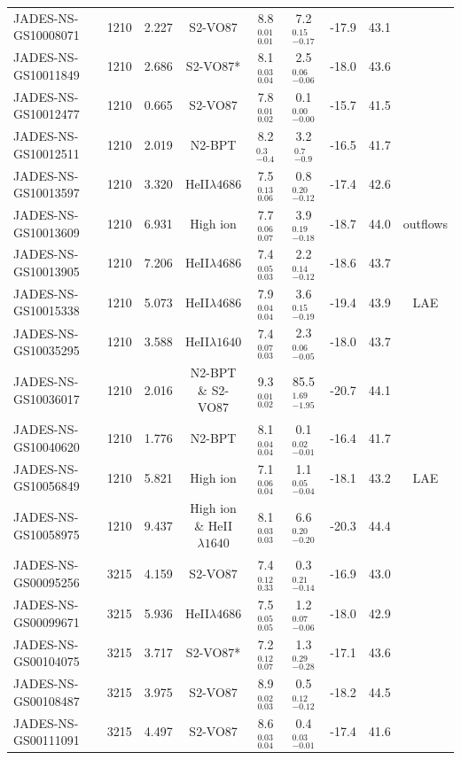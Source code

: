 \begin{tabular}{@{}lcccccccc@{}}
JADES-NS-GS10008071& 1210 &  2.227&S2-VO87&  8.8$^{0.01}_{0.01}$&  7.2$^{0.15}_{-0.17}$& -17.9&  43.1&\\
JADES-NS-GS10011849& 1210 &  2.686&S2-VO87*&  8.1$^{0.03}_{0.04}$&  2.5$^{0.06}_{-0.06}$& -18.0&  43.6&\\
JADES-NS-GS10012477& 1210 &  0.665&S2-VO87&  7.8$^{0.01}_{0.02}$&  0.1$^{0.00}_{-0.00}$& -15.7&  41.5&\\
JADES-NS-GS10012511& 1210 &  2.019&N2-BPT&  8.2 $^{0.3}_{-0.4}$&  3.2 $^{0.7}_{-0.9}$& -16.5&  41.7&\\
JADES-NS-GS10013597& 1210 &  3.320&HeII$\lambda4686$&  7.5$^{0.13}_{0.06}$&  0.8$^{0.20}_{-0.12}$& -17.4&  42.6&\\
JADES-NS-GS10013609& 1210 &  6.931&High ion&  7.7$^{0.06}_{0.07}$&  3.9$^{0.19}_{-0.18}$& -18.7&  44.0&outflows\\
JADES-NS-GS10013905& 1210 &  7.206&HeII$\lambda4686$&  7.4$^{0.05}_{0.03}$&  2.2$^{0.14}_{-0.12}$& -18.6&  43.7&\\
JADES-NS-GS10015338& 1210 &  5.073&HeII$\lambda4686$&  7.9$^{0.04}_{0.04}$&  3.6$^{0.15}_{-0.19}$& -19.4&  43.9&LAE\\
JADES-NS-GS10035295& 1210 &  3.588&HeII$\lambda1640$&  7.4$^{0.07}_{0.03}$&  2.3$^{0.06}_{-0.05}$& -18.0&  43.7&\\
JADES-NS-GS10036017& 1210 &  2.016&N2-BPT \& S2-VO87&  9.3$^{0.01}_{0.02}$&  85.5$^{1.69}_{-1.95}$& -20.7&  44.1&\\
JADES-NS-GS10040620& 1210 &  1.776&N2-BPT&  8.1$^{0.04}_{0.04}$&  0.1$^{0.02}_{-0.01}$& -16.4&  41.7&\\
JADES-NS-GS10056849& 1210 &  5.821&High ion&  7.1$^{0.06}_{0.04}$&  1.1$^{0.05}_{-0.04}$& -18.1&  43.2&LAE\\
JADES-NS-GS10058975& 1210 &  9.437&High ion \& HeII$\lambda1640$&  8.1$^{0.03}_{0.03}$&  6.6$^{0.20}_{-0.20}$& -20.3&  44.4&\\
JADES-NS-GS00095256& 3215 &  4.159&S2-VO87&  7.4$^{0.12}_{0.33}$&  0.3$^{0.21}_{-0.14}$& -16.9&  43.0&\\
JADES-NS-GS00099671& 3215 &  5.936&HeII$\lambda4686$&  7.5$^{0.05}_{0.05}$&  1.2$^{0.07}_{-0.06}$& -18.0&  42.9&\\
JADES-NS-GS00104075& 3215 &  3.717&S2-VO87*&  7.2$^{0.12}_{0.07}$&  1.3$^{0.29}_{-0.28}$& -17.1&  43.6&\\
JADES-NS-GS00108487& 3215 &  3.975&S2-VO87&  8.9$^{0.02}_{0.03}$&  0.5$^{0.12}_{-0.12}$& -18.2&  44.5&\\
JADES-NS-GS00111091& 3215 &  4.497&S2-VO87&  8.6$^{0.03}_{0.04}$&  0.4$^{0.03}_{-0.01}$& -17.4&  41.6&\\

\end{tabular}
